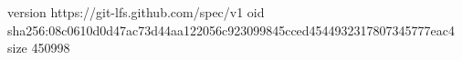 version https://git-lfs.github.com/spec/v1
oid sha256:08c0610d0d47ac73d44aa122056c923099845cced4544932317807345777eac4
size 450998
